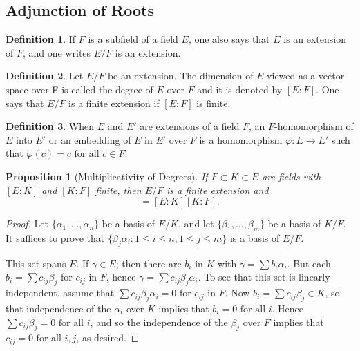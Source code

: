 \documentclass[draft]{article}
\newtheorem{prop}[thm]{Proposition}
\theoremstyle{definition}
\newtheorem{defn}{Definition}[section]
\theoremstyle{remark}
\begin{document}
		\subsection{Adjunction of Roots}
		
			\begin{defn}
				If $F$ is a subfield of a field $E$, one also says that $E$ is an extension of $F$, and one writes $E/F$ is an extension.
			\end{defn}
			
			\begin{defn}
				Let $E/F$ be an extension. The dimension of $E$ viewed as a vector space over F is called the degree of $E$ over $F$ and it is denoted by $[E : F]$. One says that $E/F$ is a finite extension if $[E : F]$ is finite.
			\end{defn}
			
			\begin{defn}
			    When $E$ and $E'$ are extensions of a field $F$, an $F$-homomorphism of $E$ into $E'$ or an embedding of $E$ in $E'$ over $F$ is a homomorphism $\varphi: E \to E'$ such that $\varphi(c) = c \text{ for all } c \in F$. 
			\end{defn}
			
			\begin{prop}[Multiplicativity of Degrees]
				If $F \subset K \subset E$ are fields with $[E : K]$ and $[K : F]$ finite, then $E/F$ is a finite extension and
				\begin{equation*}
					[E : F] = [E : K][K : F].
				\end{equation*}
			\end{prop}
			
			\begin{proof}
				Let $\{\alpha_1, \dots, \alpha_n\}$ be a basis of $E/K$, and let $\{\beta_1, \dots, \beta_m\}$ be a basis of $K/F$. It suffices to prove that $\{\beta_j\alpha_i : 1 \leq i \leq n, 1 \leq j \leq m\}$ is a basis of $E/F$.\par
				This set spans $E$. If $\gamma \in E$; then there are $b_i$ in $K$ with $\gamma = \sum{b_i\alpha_i}$. But each $b_i = \sum{c_{ij}\beta_j}$ for $c_{ij}$ in $F$, hence $\gamma = \sum{c_{ij}\beta_j\alpha_i}$. To see that this set is linearly independent, assume that $\sum{c_{ij}\beta_j\alpha_i} = 0$ for $c_{ij}$ in $F$. Now $b_i = \sum{c_{ij}\beta_j} \in K$, so that independence of the $\alpha_i$ over $K$ implies that $b_i = 0 \text{ for all } i$. Hence $\sum{c_{ij}\beta_j} = 0 \text{ for all } i$, and so the independence of the $\beta_j$ over $F$ implies that $c_{ij} = 0 \text{ for all } i, j$, as desired.
			\end{proof}
			
\end{document}
